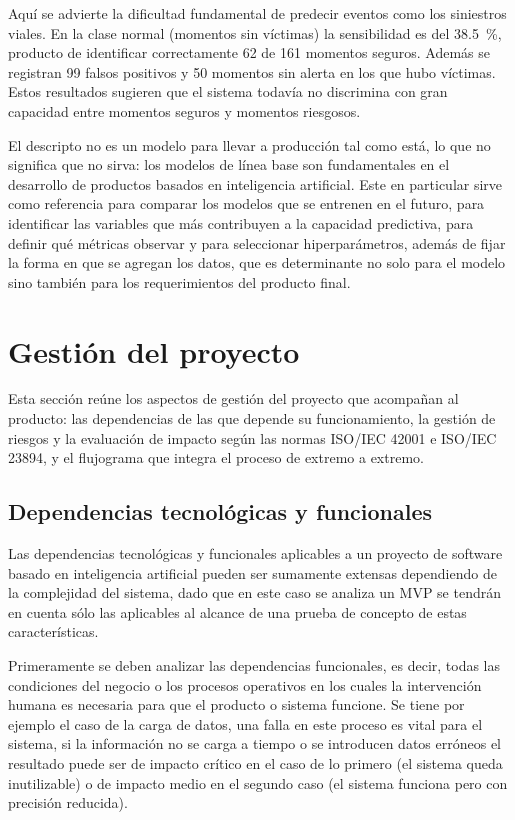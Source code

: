 Aquí se advierte la dificultad fundamental de predecir eventos como los siniestros viales. En la clase normal (momentos sin víctimas) la sensibilidad es del \qty{38.5}{\percent}, producto de identificar correctamente 62 de 161 momentos seguros. Además se registran 99 falsos positivos y 50 momentos sin alerta en los que hubo víctimas. Estos resultados sugieren que el sistema todavía no discrimina con gran capacidad entre momentos seguros y momentos riesgosos.

El \xgboost{} descripto no es un modelo para llevar a producción tal como está, lo que no significa que no sirva: los modelos de línea base son fundamentales en el desarrollo de productos basados en inteligencia artificial. Este en particular sirve como referencia para comparar los modelos que se entrenen en el futuro, para identificar las variables que más contribuyen a la capacidad predictiva, para definir qué métricas observar y para seleccionar hiperparámetros, además de fijar la forma en que se agregan los datos, que es determinante no solo para el modelo sino también para los requerimientos del producto final.

\section{Gestión del proyecto}\label{gestiuxf3n-del-proyecto}

Esta sección reúne los aspectos de gestión del proyecto que acompañan al producto: las dependencias de las que depende su funcionamiento, la gestión de riesgos y la evaluación de impacto según las normas ISO/IEC 42001 e ISO/IEC 23894, y el flujograma que integra el proceso de extremo a extremo.

\subsection{Dependencias tecnológicas y funcionales}\label{dependencias-tecnoluxf3gicas-y-funcionales}

Las dependencias tecnológicas y funcionales aplicables a un proyecto de software basado en inteligencia artificial pueden ser sumamente extensas dependiendo de la complejidad del sistema, dado que en este caso se analiza un MVP se tendrán en cuenta sólo las aplicables al alcance de una prueba de concepto de estas características.

Primeramente se deben analizar las dependencias funcionales, es decir, todas las condiciones del negocio o los procesos operativos en los cuales la intervención humana es necesaria para que el producto o sistema funcione. Se tiene por ejemplo el caso de la carga de datos, una falla en este proceso es vital para el sistema, si la información no se carga a tiempo o se introducen datos erróneos el resultado puede ser de impacto crítico en el caso de lo primero (el sistema queda inutilizable) o de impacto medio en el segundo caso (el sistema funciona pero con precisión reducida).

